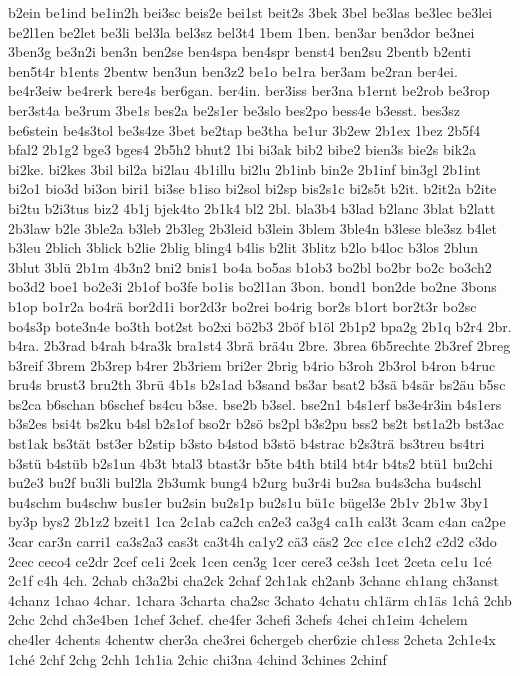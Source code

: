 {b2ein
be1ind
be1in2h
bei3sc
beis2e
bei1st
beit2s
3bek
3bel
be3las
be3lec
be3lei
be2l1en
be2let
be3li
bel3la
bel3sz
bel3t4
1bem
1ben.
ben3ar
ben3dor
be3nei
3ben3g
be3n2i
ben3n
ben2se
ben4spa
ben4spr
benst4
ben2su
2bentb
b2enti
ben5t4r
b1ents
2bentw
ben3un
ben3z2
be1o
be1ra
ber3am
be2ran
ber4ei.
be4r3eiw
be4rerk
bere4s
ber6gan.
ber4in.
ber3iss
ber3na
b1ernt
be2rob
be3rop
ber3st4a
be3rum
3be1s
bes2a
be2s1er
be3slo
bes2po
bess4e
b3esst.
bes3sz
be6stein
be4s3tol
be3s4ze
3bet
be2tap
be3tha
be1ur
3b2ew
2b1ex
1bez
2b5f4
bfal2
2b1g2
bge3
bges4
2b5h2
bhut2
1bi
bi3ak
bib2
bibe2
bien3s
bie2s
bik2a
bi2ke.
bi2kes
3bil
bil2a
bi2lau
4b1illu
bi2lu
2b1inb
bin2e
2b1inf
bin3gl
2b1int
bi2o1
bio3d
bi3on
biri1
bi3se
b1iso
bi2sol
bi2sp
bis2s1c
bi2s5t
b2it.
b2it2a
b2ite
bi2tu
b2i3tus
biz2
4b1j
bjek4to
2b1k4
bl2
2bl.
bla3b4
b3lad
b2lanc
3blat
b2latt
2b3law
b2le
3ble2a
b3leb
2b3leg
2b3leid
b3lein
3blem
3ble4n
b3lese
ble3sz
b4let
b3leu
2blich
3blick
b2lie
2blig
bling4
b4lis
b2lit
3blitz
b2lo
b4loc
b3los
2blun
3blut
3blü
2b1m
4b3n2
bni2
bnis1
bo4a
bo5as
b1ob3
bo2bl
bo2br
bo2c
bo3ch2
bo3d2
boe1
bo2e3i
2b1of
bo3fe
bo1is
bo2l1an
3bon.
bond1
bon2de
bo2ne
3bons
b1op
bo1r2a
bo4rä
bor2d1i
bor2d3r
bo2rei
bo4rig
bor2s
b1ort
bor2t3r
bo2sc
bo4s3p
bote3n4e
bo3th
bot2st
bo2xi
bö2b3
2böf
b1öl
2b1p2
bpa2g
2b1q
b2r4
2br.
b4ra.
2b3rad
b4rah
b4ra3k
bra1st4
3brä
brä4u
2bre.
3brea
6b5rechte
2b3ref
2breg
b3reif
3brem
2b3rep
b4rer
2b3riem
bri2er
2brig
b4rio
b3roh
2b3rol
b4ron
b4ruc
bru4s
brust3
bru2th
3brü
4b1s
b2s1ad
b3sand
bs3ar
bsat2
b3sä
b4sär
bs2äu
b5sc
bs2ca
b6schan
b6schef
bs4cu
b3se.
bse2b
b3sel.
bse2n1
b4s1erf
bs3e4r3in
b4s1ers
b3s2es
bsi4t
bs2ku
b4sl
b2s1of
bso2r
b2sö
bs2pl
b3s2pu
bss2
bs2t
bst1a2b
bst3ac
bst1ak
bs3tät
bst3er
b2stip
b3sto
b4stod
b3stö
b4strac
b2s3trä
bs3treu
bs4tri
b3stü
b4stüb
b2s1un
4b3t
btal3
btast3r
b5te
b4th
btil4
bt4r
b4ts2
btü1
bu2chi
bu2e3
bu2f
bu3li
bul2la
2b3umk
bung4
b2urg
bu3r4i
bu2sa
bu4s3cha
bu4schl
bu4schm
bu4schw
bus1er
bu2sin
bu2s1p
bu2s1u
bü1c
bügel3e
2b1v
2b1w
3by1
by3p
bys2
2b1z2
bzeit1
1ca
2c1ab
ca2ch
ca2e3
ca3g4
ca1h
cal3t
3cam
c4an
ca2pe
3car
car3n
carri1
ca3s2a3
cas3t
ca3t4h
ca1y2
cä3
cäs2
2cc
c1ce
c1ch2
c2d2
c3do
2cec
ceco4
ce2dr
2cef
ce1i
2cek
1cen
cen3g
1cer
cere3
ce3sh
1cet
2ceta
ce1u
1cé
2c1f
c4h
4ch.
2chab
ch3a2bi
cha2ck
2chaf
2ch1ak
ch2anb
3chanc
ch1ang
ch3anst
4chanz
1chao
4char.
1chara
3charta
cha2sc
3chato
4chatu
ch1ärm
ch1äs
1châ
2chb
2chc
2chd
ch3e4ben
1chef
3chef.
che4fer
3chefi
3chefs
4chei
ch1eim
4chelem
che4ler
4chents
4chentw
cher3a
che3rei
6chergeb
cher6zie
ch1ess
2cheta
2ch1e4x
1ché
2chf
2chg
2chh
1ch1ia
2chic
chi3na
4chind
3chines
2chinf
}
